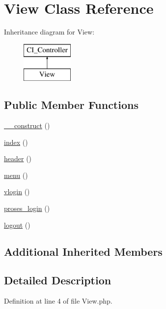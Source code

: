 \hypertarget{class_view}{}\section{View Class Reference}
\label{class_view}
Inheritance diagram for View\+:\begin{figure}[H]
\begin{center}
\leavevmode
\includegraphics[height=2.000000cm]{class_view}
\end{center}
\end{figure}
\subsection*{Public Member Functions}
\begin{DoxyCompactItemize}
\item 
\mbox{\hyperlink{class_view_a095c5d389db211932136b53f25f39685}{\+\_\+\+\_\+construct}} ()
\item 
\mbox{\hyperlink{class_view_a149eb92716c1084a935e04a8d95f7347}{index}} ()
\item 
\mbox{\hyperlink{class_view_aafc568a720a06040aa70083c38435804}{header}} ()
\item 
\mbox{\hyperlink{class_view_a0b186fb0489b5ca85dd5da0b195aa9c9}{menu}} ()
\item 
\mbox{\hyperlink{class_view_a98ecf53d97093f0f50b149bd0a8b6f9e}{vlogin}} ()
\item 
\mbox{\hyperlink{class_view_abf863f5ed9a81d1c9296de687c05fec0}{proses\+\_\+login}} ()
\item 
\mbox{\hyperlink{class_view_a082405d89acd6835c3a7c7a08a7adbab}{logout}} ()
\end{DoxyCompactItemize}
\subsection*{Additional Inherited Members}


\subsection{Detailed Description}


Definition at line 4 of file View.\+php.



